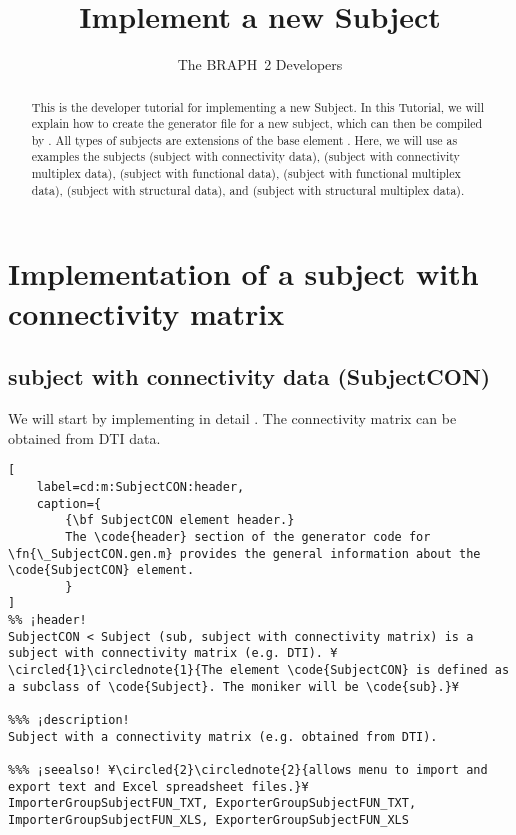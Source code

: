 \documentclass{tufte-handout}
\title{Implement a new Subject}
\author[The BRAPH~2 Developers]{The BRAPH~2 Developers}
\begin{document}
\maketitle

\begin{abstract}
\noindent
This is the developer tutorial for implementing a new Subject. 
In this Tutorial, we will explain how to create the generator file  for a new subject, which can then be compiled by . All types of subjects are extensions of the base element . Here, we will use as examples the subjects  (subject with connectivity data),  (subject with connectivity multiplex data),  (subject with functional data),  (subject with functional multiplex data),  (subject with structural data), and  (subject with structural multiplex data).
\end{abstract}

\tableofcontents

\clearpage
\section{Implementation of a subject with connectivity matrix}

\subsection{subject with connectivity data (SubjectCON)}

We will start by implementing in detail . The connectivity matrix can be obtained from DTI data.

\begin{lstlisting}[
	label=cd:m:SubjectCON:header,
	caption={
		{\bf SubjectCON element header.}
		The \code{header} section of the generator code for \fn{\_SubjectCON.gen.m} provides the general information about the \code{SubjectCON} element.
		}
]
%% ¡header!
SubjectCON < Subject (sub, subject with connectivity matrix) is a subject with connectivity matrix (e.g. DTI). ¥\circled{1}\circlednote{1}{The element \code{SubjectCON} is defined as a subclass of \code{Subject}. The moniker will be \code{sub}.}¥

%%% ¡description!
Subject with a connectivity matrix (e.g. obtained from DTI).

%%% ¡seealso! ¥\circled{2}\circlednote{2}{allows menu to import and export text and Excel spreadsheet files.}¥
ImporterGroupSubjectFUN_TXT, ExporterGroupSubjectFUN_TXT, ImporterGroupSubjectFUN_XLS, ExporterGroupSubjectFUN_XLS
\end{lstlisting}
\end{document}
